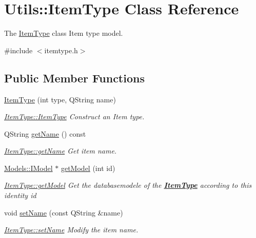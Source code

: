 \hypertarget{classUtils_1_1ItemType}{\section{Utils\-:\-:Item\-Type Class Reference}
\label{classUtils_1_1ItemType}
}


The \hyperlink{classUtils_1_1ItemType}{Item\-Type} class Item type model.  




{\ttfamily \#include $<$itemtype.\-h$>$}

\subsection*{Public Member Functions}
\begin{DoxyCompactItemize}
\item 
\hyperlink{classUtils_1_1ItemType_a5b06f6c289619f01ced33db7b16ab0f9}{Item\-Type} (int type, Q\-String name)
\begin{DoxyCompactList}\small\item\em \hyperlink{classUtils_1_1ItemType_a5b06f6c289619f01ced33db7b16ab0f9}{Item\-Type\-::\-Item\-Type} Construct an Item type. \end{DoxyCompactList}\item 
Q\-String \hyperlink{classUtils_1_1ItemType_a09fdb09837ad0ab678a271d3f97dd006}{get\-Name} () const 
\begin{DoxyCompactList}\small\item\em \hyperlink{classUtils_1_1ItemType_a09fdb09837ad0ab678a271d3f97dd006}{Item\-Type\-::get\-Name} Get item name. \end{DoxyCompactList}\item 
\hyperlink{classModels_1_1IModel}{Models\-::\-I\-Model} $\ast$ \hyperlink{classUtils_1_1ItemType_aff3b98516a4ee741cf926d9cd7cbd131}{get\-Model} (int id)
\begin{DoxyCompactList}\small\item\em \hyperlink{classUtils_1_1ItemType_aff3b98516a4ee741cf926d9cd7cbd131}{Item\-Type\-::get\-Model} Get the databasemodele of the {\bfseries \hyperlink{classUtils_1_1ItemType}{Item\-Type}} according to this identity {\itshape id} \end{DoxyCompactList}\item 
void \hyperlink{classUtils_1_1ItemType_aa993c315def3988851fc3af5f826c384}{set\-Name} (const Q\-String \&name)
\begin{DoxyCompactList}\small\item\em \hyperlink{classUtils_1_1ItemType_aa993c315def3988851fc3af5f826c384}{Item\-Type\-::set\-Name} Modify the item name. \end{DoxyCompactList}\item 

\end{DoxyCompactItemize}
